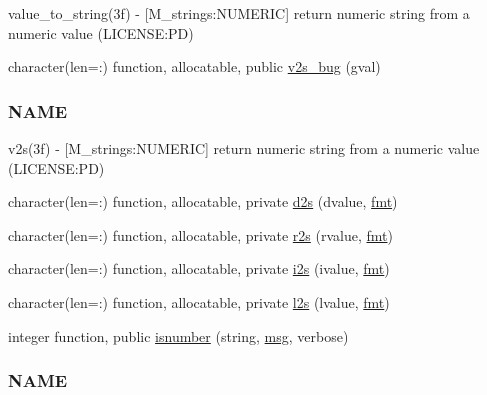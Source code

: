 \begin{DoxyCompactItemize}
\begin{DoxyCompactList}
value\+\_\+to\+\_\+string(3f) -\/ \mbox{[}M\+\_\+strings\+:N\+U\+M\+E\+R\+IC\mbox{]} return numeric string from a numeric value (L\+I\+C\+E\+N\+SE\+:PD) \end{DoxyCompactList}\item 
character(len=\+:) function, allocatable, public \mbox{\hyperlink{namespacem__strings_a76a00e3ca7fb7c9b9cadcd484c6e3946}{v2s\+\_\+bug}} (gval)
\begin{DoxyCompactList}\small\item\em \subsubsection*{N\+A\+ME}

v2s(3f) -\/ \mbox{[}M\+\_\+strings\+:N\+U\+M\+E\+R\+IC\mbox{]} return numeric string from a numeric value (L\+I\+C\+E\+N\+SE\+:PD) \end{DoxyCompactList}\item 
character(len=\+:) function, allocatable, private \mbox{\hyperlink{namespacem__strings_a14715e071aea9030b4c68c22fa5a455d}{d2s}} (dvalue, \mbox{\hyperlink{namespacem__strings_afccf1e453a4315a639f133f2f7c0078b}{fmt}})
\item 
character(len=\+:) function, allocatable, private \mbox{\hyperlink{namespacem__strings_ab67ea90007b3f2eb308a5fe8d1cf0df1}{r2s}} (rvalue, \mbox{\hyperlink{namespacem__strings_afccf1e453a4315a639f133f2f7c0078b}{fmt}})
\item 
character(len=\+:) function, allocatable, private \mbox{\hyperlink{namespacem__strings_a76d3a650fbfec1f65d8fd81042347408}{i2s}} (ivalue, \mbox{\hyperlink{namespacem__strings_afccf1e453a4315a639f133f2f7c0078b}{fmt}})
\item 
character(len=\+:) function, allocatable, private \mbox{\hyperlink{namespacem__strings_a75aa4dfd0a231e2bcad03d26231a7c29}{l2s}} (lvalue, \mbox{\hyperlink{namespacem__strings_afccf1e453a4315a639f133f2f7c0078b}{fmt}})
\item 
integer function, public \mbox{\hyperlink{namespacem__strings_a2b6c57cbc52fc86d2f02d0936d3484af}{isnumber}} (string, \mbox{\hyperlink{interfacem__strings_1_1msg}{msg}}, verbose)
\begin{DoxyCompactList}\small\item\em \subsubsection*{N\+A\+ME}


\end{DoxyCompactList}
\end{DoxyCompactItemize}

